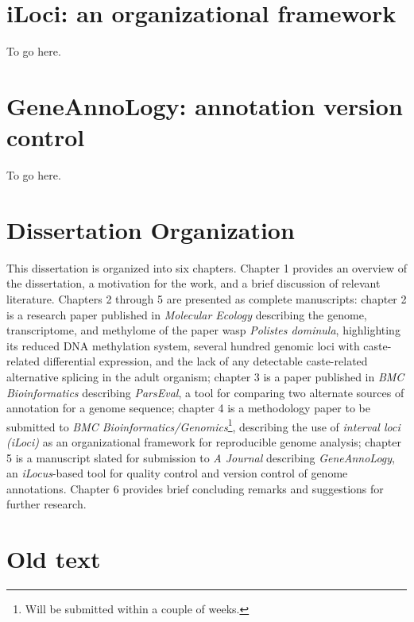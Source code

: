 \section{iLoci: an organizational framework}

To go here.

\section{GeneAnnoLogy: annotation version control}

To go here.

\section{Dissertation Organization}

This dissertation is organized into six chapters.
Chapter 1 provides an overview of the dissertation, a motivation for the work, and a brief discussion of relevant literature.
Chapters 2 through 5 are presented as complete manuscripts:
chapter 2 is a research paper published in \textit{Molecular Ecology} describing the genome, transcriptome, and methylome of the paper wasp \textit{Polistes dominula}, highlighting its reduced DNA methylation system, several hundred genomic loci with caste-related differential expression, and the lack of any detectable caste-related alternative splicing in the adult organism;
chapter 3 is a paper published in \textit{BMC Bioinformatics} describing \textit{ParsEval}, a tool for comparing two alternate sources of annotation for a genome sequence;
chapter 4 is a methodology paper to be submitted to \textit{BMC Bioinformatics/Genomics}\footnote{Will be submitted within a couple of weeks.}, describing the use of \textit{interval loci (iLoci)} as an organizational framework for reproducible genome analysis;
chapter 5 is a manuscript slated for submission to \textit{A Journal} describing \textit{GeneAnnoLogy}, an \textit{iLocus}-based tool for quality control and version control of genome annotations.
Chapter 6 provides brief concluding remarks and suggestions for further research.


\section{Old text}

